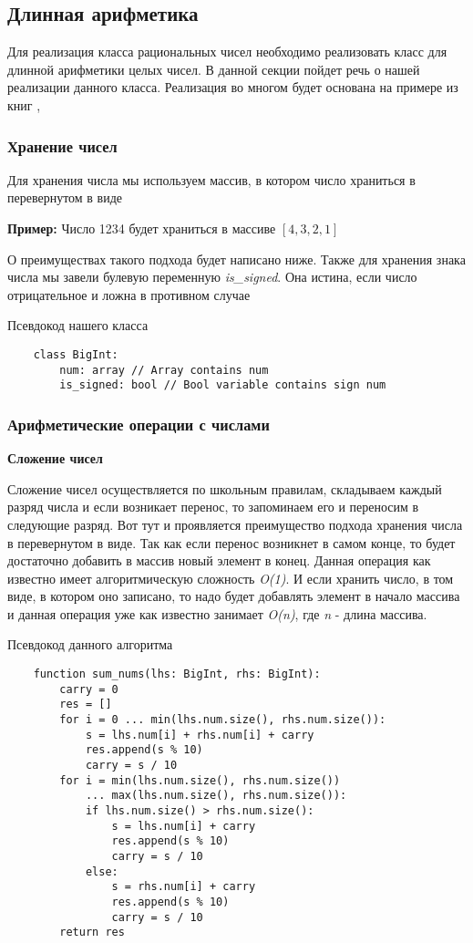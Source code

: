 \documentclass[a4paper,article,14pt]{extarticle}
\begin{document}
\subsection{Длинная арифметика}

Для реализация класса рациональных чисел необходимо реализовать класс
для длинной арифметики целых чисел. В данной секции пойдет речь о нашей 
реализации данного класса. Реализация во многом будет основана на примере из книг \cite{2}, \cite{3}

\subsubsection{Хранение чисел} 
Для хранения числа мы используем массив, в котором число храниться в перевернутом в виде

\textbf{Пример:} Число 1234 будет храниться в массиве $ [4, 3, 2, 1] $ 

О преимуществах такого подхода будет написано ниже. Также для хранения знака 
числа мы завели булевую переменную \emph{is\_signed}. Она истина, если 
число отрицательное и ложна в противном случае

Псевдокод нашего класса

\begin{lstlisting}
    class BigInt:
        num: array // Array contains num
        is_signed: bool // Bool variable contains sign num
\end{lstlisting}


\subsubsection{Арифметические операции с числами}

\textbf{Сложение чисел}

Сложение чисел осуществляется по школьным правилам, складываем
каждый разряд числа и если возникает перенос, то запоминаем его и переносим в 
следующие разряд. Вот тут и проявляется преимущество подхода хранения числа
в перевернутом в виде. Так как если перенос возникнет в самом конце, то будет достаточно
добавить в массив новый элемент в конец. Данная операция как известно имеет 
алгоритмическую сложность \emph{O(1)}. И если хранить число, в том виде, в котором 
оно записано, то надо будет добавлять элемент в начало массива и данная 
операция уже как известно занимает \emph{O(n)}, где \emph{n} - длина массива.

Псевдокод данного алгоритма

\begin{lstlisting}
    function sum_nums(lhs: BigInt, rhs: BigInt):
        carry = 0 
        res = []
        for i = 0 ... min(lhs.num.size(), rhs.num.size()):
            s = lhs.num[i] + rhs.num[i] + carry
            res.append(s % 10)
            carry = s / 10
        for i = min(lhs.num.size(), rhs.num.size()) 
            ... max(lhs.num.size(), rhs.num.size()):
            if lhs.num.size() > rhs.num.size():
                s = lhs.num[i] + carry
                res.append(s % 10)
                carry = s / 10
            else:
                s = rhs.num[i] + carry
                res.append(s % 10)
                carry = s / 10
        return res
\end{lstlisting}
\end{document}
